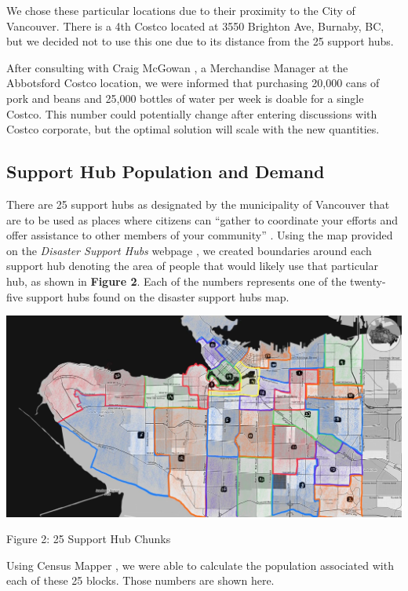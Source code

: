 \documentclass{article}
\begin{document}
We chose these particular locations due to their proximity to the City of Vancouver. There is a 4th Costco located at 3550 Brighton Ave, Burnaby, BC, but we decided not to use this one due to its distance from the 25 support hubs. 

After consulting with Craig McGowan \cite{craig}, a Merchandise Manager at the Abbotsford Costco location, we were informed that purchasing 20,000 cans of pork and beans and 25,000 bottles of water per week is doable for a single Costco. This number could potentially change after entering discussions with Costco corporate, but the optimal solution will scale with the new quantities.

\subsection{Support Hub Population and Demand}

There are 25 support hubs as designated by the municipality of Vancouver that are to be used as places where citizens can ``gather to coordinate your efforts and offer assistance to other members of your community'' \cite{Vancouver.ca}.
Using the map provided on the \textit{Disaster Support Hubs} webpage \cite{Vancouver.ca}, we created boundaries around each support hub denoting the area of people that would likely use that particular hub, as shown in \textbf{Figure 2}. Each of the numbers represents one of the twenty-five support hubs found on the disaster support hubs map.

\begin{center}
    \includegraphics[scale=.25]{map_25_chunks.jpg}
    \caption{Figure 2: 25 Support Hub Chunks}
\end{center}

Using Census Mapper \cite{censusmapper}, we were able to calculate the population associated with each of these 25 blocks. Those numbers are shown here. 
\end{document}
